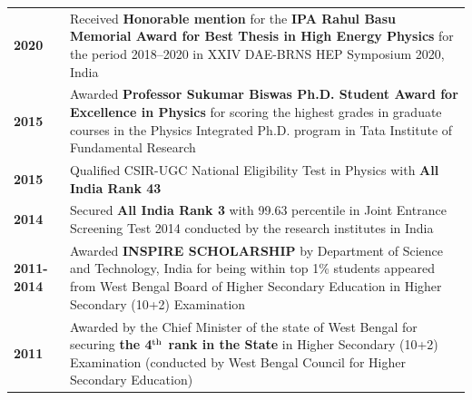 \documentclass[a4paper,11pt]{article}
\begin{document}
{\begin{tabular}{ p{2cm} p{13cm} }
\textbf{2020} & {Received \textbf{Honorable mention} for the \textbf{IPA Rahul Basu Memorial Award for Best Thesis in High Energy Physics} for the period 2018--2020 in XXIV DAE-BRNS HEP Symposium 2020, India} \\
\textbf{2015} & {Awarded \textbf{Professor Sukumar Biswas Ph.D. Student Award for Excellence in Physics} for scoring the highest grades in graduate courses in the Physics Integrated Ph.D. program in Tata Institute of Fundamental Research} \\
\textbf{2015} \ & Qualified CSIR-UGC National Eligibility Test in Physics with \textbf{All India Rank 43} \\
\textbf{2014} \ & Secured \textbf{All India Rank 3} with 99.63 percentile in Joint Entrance Screening Test 2014 conducted by the research institutes in India  \\
\textbf{2011-2014} \ &  Awarded \textbf{INSPIRE SCHOLARSHIP} by Department of Science and Technology, India for being within top 1\% students appeared from West Bengal Board of Higher Secondary Education in Higher Secondary (10+2) Examination \\
\textbf{2011} \ & Awarded by the Chief Minister of the state of West Bengal for securing \textbf{the 4$^{\rm{th}}$ rank in the State} in Higher Secondary (10+2) Examination (conducted by West Bengal Council for Higher Secondary Education)  \\
\end{tabular}


}
\end{document}
